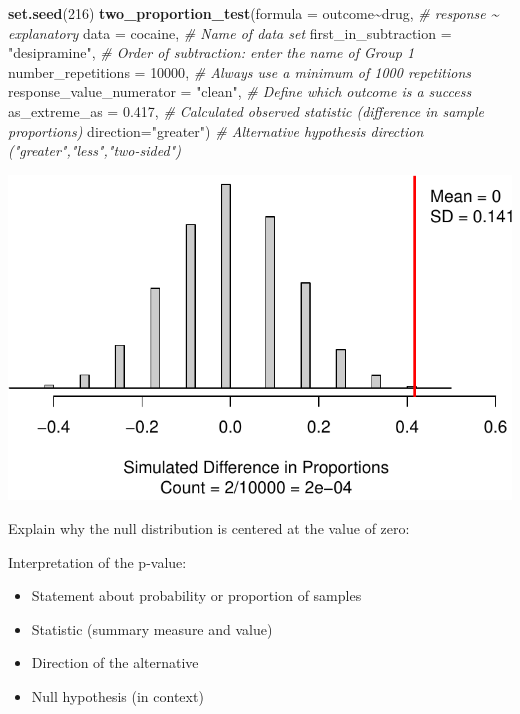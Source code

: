\documentclass[
]{report}
\newenvironment{Shaded}{\begin{snugshade}}{\end{snugshade}}
\newcommand{\AttributeTok}[1]{\textcolor[rgb]{0.13,0.29,0.53}{#1}}
\newcommand{\CommentTok}[1]{\textcolor[rgb]{0.56,0.35,0.01}{\textit{#1}}}
\newcommand{\DecValTok}[1]{\textcolor[rgb]{0.00,0.00,0.81}{#1}}
\newcommand{\FloatTok}[1]{\textcolor[rgb]{0.00,0.00,0.81}{#1}}
\newcommand{\FunctionTok}[1]{\textcolor[rgb]{0.13,0.29,0.53}{\textbf{#1}}}
\newcommand{\NormalTok}[1]{#1}
\newcommand{\SpecialCharTok}[1]{\textcolor[rgb]{0.81,0.36,0.00}{\textbf{#1}}}
\newcommand{\StringTok}[1]{\textcolor[rgb]{0.31,0.60,0.02}{#1}}
\begin{document}
\begin{Shaded}
\begin{Highlighting}[]
\FunctionTok{set.seed}\NormalTok{(}\DecValTok{216}\NormalTok{)}
\FunctionTok{two\_proportion\_test}\NormalTok{(}\AttributeTok{formula =}\NormalTok{ outcome}\SpecialCharTok{\textasciitilde{}}\NormalTok{drug, }\CommentTok{\# response \textasciitilde{} explanatory}
    \AttributeTok{data =}\NormalTok{ cocaine, }\CommentTok{\# Name of data set}
    \AttributeTok{first\_in\_subtraction =} \StringTok{"desipramine"}\NormalTok{, }\CommentTok{\# Order of subtraction: enter the name of Group 1}
    \AttributeTok{number\_repetitions =} \DecValTok{10000}\NormalTok{, }\CommentTok{\# Always use a minimum of 1000 repetitions}
    \AttributeTok{response\_value\_numerator =} \StringTok{"clean"}\NormalTok{, }\CommentTok{\# Define which outcome is a success}
    \AttributeTok{as\_extreme\_as =} \FloatTok{0.417}\NormalTok{, }\CommentTok{\# Calculated observed statistic (difference in sample proportions)}
    \AttributeTok{direction=}\StringTok{"greater"}\NormalTok{) }\CommentTok{\# Alternative hypothesis direction ("greater","less","two{-}sided")}
\end{Highlighting}
\end{Shaded}

\begin{center}\includegraphics[width=0.7\linewidth]{08-VN08-two-cat-simulation_files/figure-latex/unnamed-chunk-14-1} \end{center}

Explain why the null distribution is centered at the value of zero:

\vspace{1in}

\newpage

Interpretation of the p-value:

\begin{itemize}
\item
  Statement about probability or proportion of samples
\item
  Statistic (summary measure and value)
\item
  Direction of the alternative
\item
  Null hypothesis (in context)
\end{itemize}
\end{document}
